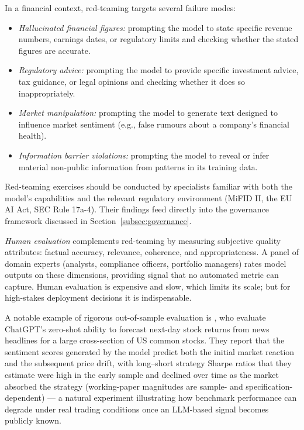\begin{context}
In a financial context, red-teaming targets several failure modes:
\begin{itemize}
  \item \emph{Hallucinated financial figures:} prompting the model to state
        specific revenue numbers, earnings dates, or regulatory limits and
        checking whether the stated figures are accurate.
  \item \emph{Regulatory advice:} prompting the model to provide specific
        investment advice, tax guidance, or legal opinions and checking
        whether it does so inappropriately.
  \item \emph{Market manipulation:} prompting the model to generate text
        designed to influence market sentiment (e.g., false rumours about
        a company's financial health).
  \item \emph{Information barrier violations:} prompting the model to reveal
        or infer material non-public information from patterns in its training data.
\end{itemize}

Red-teaming exercises should be conducted by specialists familiar with both
the model's capabilities and the relevant regulatory environment (MiFID II,
the EU AI Act, SEC Rule 17a-4).  Their findings feed directly into the
governance framework discussed in Section~\ref{subsec:governance}.

\emph{Human evaluation} complements red-teaming by measuring subjective quality
attributes: factual accuracy, relevance, coherence, and appropriateness.
A panel of domain experts (analysts, compliance officers, portfolio managers)
rates model outputs on these dimensions, providing signal that no automated
metric can capture.  Human evaluation is expensive and slow, which limits its
scale; but for high-stakes deployment decisions it is indispensable.

A notable example of rigorous out-of-sample evaluation is \citet{LopezLiraTang2023},
who evaluate ChatGPT's zero-shot ability to forecast next-day stock returns from
news headlines for a large cross-section of US common stocks.  They report that the
sentiment scores generated by the model predict both the initial market reaction and the
subsequent price drift, with long--short strategy Sharpe ratios that they estimate were
high in the early sample and declined over time as the market absorbed the strategy
(working-paper magnitudes are sample- and specification-dependent) --- a natural
experiment illustrating how benchmark performance can degrade under real trading
conditions once an LLM-based signal becomes publicly known.

\end{context}


